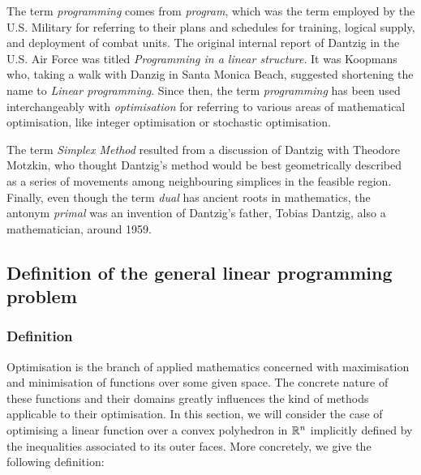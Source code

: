 The term \emph{programming} comes from \emph{program}, which was the term
employed by the U.S. Military for referring to their plans and schedules for
training, logical supply, and deployment of combat units. The original internal
report of Dantzig in the U.S. Air Force was titled \emph{Programming in a linear
structure}. It was Koopmans who, taking a walk with Danzig in Santa Monica
Beach, suggested shortening the name to \emph{Linear programming}. Since then,
the term \emph{programming} has been used interchangeably with
\emph{optimisation} for referring to various areas of mathematical optimisation,
like integer optimisation or stochastic optimisation.

The term \emph{Simplex Method} resulted from a discussion of
Dantzig with Theodore Motzkin, who thought Dantzig's method would be best
geometrically described as a series of movements among neighbouring simplices in
the feasible region. Finally, even though the term \emph{dual} has ancient roots
in mathematics, the antonym \emph{primal} was an invention of Dantzig's father,
Tobias Dantzig, also a mathematician, around 1959.

\subsection{Definition of the general linear programming problem} %
\label{ssc:int:lp:definition}

\subsubsection{Definition} %
\label{sss:int:lp:def:definition}

Optimisation is the branch of applied mathematics concerned with maximisation
and minimisation of functions over some given space. The concrete nature of
these functions and their domains greatly influences the kind of methods
applicable to their optimisation. In this section, we will consider the case of
optimising a linear function over a convex polyhedron in ${\mathbb{R}}^n$ implicitly
defined by the inequalities associated to its outer faces. More concretely, we
give the following definition:

